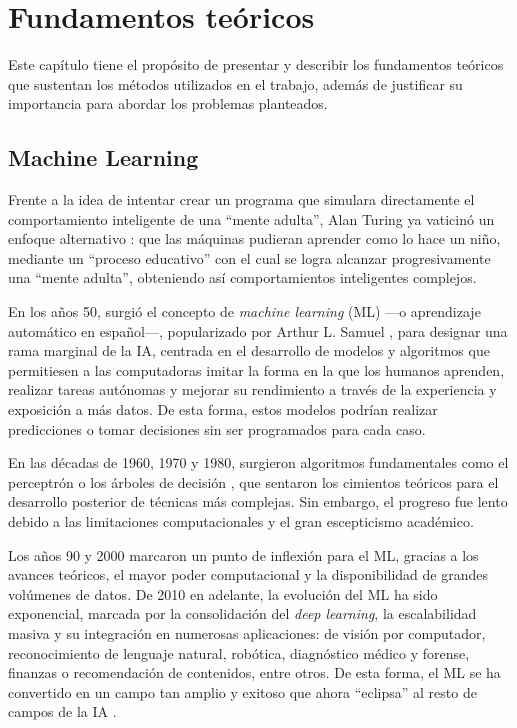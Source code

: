 \chapter{Fundamentos teóricos}

Este capítulo tiene el propósito de presentar y describir los fundamentos teóricos que sustentan los métodos 
utilizados en el trabajo, además de justificar su importancia para abordar los problemas planteados.


\section{Machine Learning}

Frente a la idea de intentar crear un programa que simulara directamente el comportamiento inteligente de una ``mente adulta'', Alan Turing ya vaticinó un enfoque alternativo \cite{turing1950}: que las máquinas pudieran aprender como lo hace un niño, mediante un ``proceso educativo'' con el cual se logra alcanzar progresivamente una ``mente adulta'', obteniendo así comportamientos inteligentes complejos.

En los años 50, surgió el concepto de \textit{machine learning} (\acrshort{ML}) ---o aprendizaje automático en español---, popularizado por Arthur L. Samuel \cite{samuel1959}, para designar una rama marginal de la \acrshort{IA}, centrada en el desarrollo de modelos y algoritmos que permitiesen a las computadoras imitar la forma en la que los humanos aprenden, realizar tareas autónomas y mejorar su rendimiento a través de la experiencia y exposición a más datos. De esta forma, estos modelos podrían realizar predicciones o tomar decisiones sin ser programados para cada caso.

En las décadas de 1960, 1970 y 1980, surgieron algoritmos fundamentales como el perceptrón \cite{mcculloch1943,rosenblatt1958} o los árboles de decisión \cite{quinlan1986}, que sentaron los cimientos teóricos para el desarrollo posterior de técnicas más complejas. Sin embargo, el progreso fue lento debido a las limitaciones computacionales y el gran escepticismo académico. 

Los años 90 y 2000 marcaron un punto de inflexión para el \acrshort{ML}, gracias a los avances teóricos, el mayor poder computacional y la disponibilidad de grandes volúmenes de datos. De 2010 en adelante, la evolución del \acrshort{ML} ha sido exponencial, marcada por la consolidación del \textit{deep learning}, la escalabilidad masiva y su integración en numerosas aplicaciones: de visión por computador, reconocimiento de lenguaje natural, robótica, diagnóstico médico y forense, finanzas o recomendación de contenidos, entre otros. De esta forma, el \acrshort{ML} se ha convertido en un campo tan amplio y exitoso que ahora ``eclipsa'' al resto de campos de la \acrshort{IA} \cite{domingos2015}.

